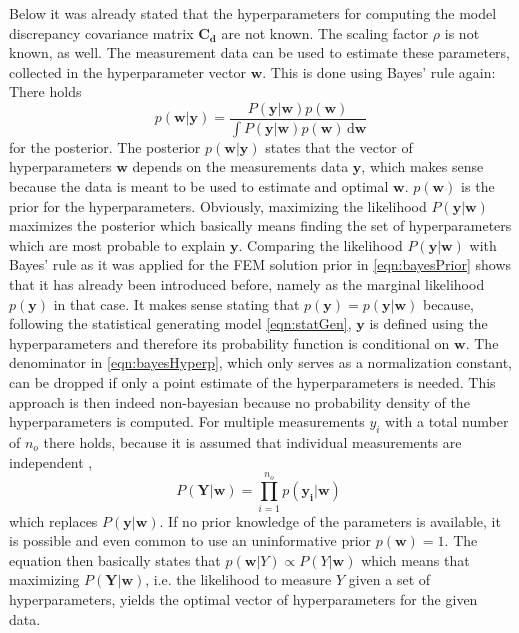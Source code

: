 \documentclass[%
  a4paper,oneside,%
  11pt,%
  smallchapters,
  style=printdev,
  extramargin,
  green,%
  rgb, <cmyk>
  ]{tubsbook}
\begin{document}
Below it was already stated that the hyperparameters for computing the model discrepancy covariance matrix $\bm{C_d}$ are not known. The scaling factor $\rho$ is not known, as well. The measurement data can be used to estimate these parameters, collected in the hyperparameter vector $\bm{w}$. This is done using Bayes' rule again: There holds
%
\begin{equation}
p(\bm{w}|\bm{y}) = \frac{P(\bm{y}|\bm{w}) p(\bm{w})}{\int P(\bm{y}|\bm{w}) p(\bm{w}) \, \mathrm{d}\bm{w}}
\label{eqn:bayesHyperp}
\end{equation}
%
for the posterior. The posterior $p(\bm{w}|\bm{y})$ states that the vector of hyperparameters $\bm{w}$ depends on the measurements data $\bm{y}$, which makes sense because the data is meant to be used to estimate and optimal $\bm{w}$. $p(\bm{w})$ is the prior for the hyperparameters. Obviously, maximizing the likelihood $P(\bm{y}|\bm{w})$ maximizes the posterior which basically means finding the set of hyperparameters which are most probable to explain $\bm{y}$. Comparing the likelihood $P(\bm{y}|\bm{w})$ with Bayes' rule as it was applied for the FEM solution prior in \ref{eqn:bayesPrior} shows that it has already been introduced before, namely as the marginal likelihood $p(\bm{y})$ in that case. It makes sense stating that $p(\bm{y}) = p(\bm{y}|\bm{w})$ because, following the statistical generating model \ref{eqn:statGen}, $\bm{y}$ is defined using the hyperparameters and therefore its probability function is conditional on $\bm{w}$. \cite[p.12]{girolami2021}
The denominator in \ref{eqn:bayesHyperp}, which only serves as a normalization constant, can be dropped if only a point estimate of the hyperparameters is needed. This approach is then indeed non-bayesian because no probability density of the hyperparameters is computed.
For multiple measurements $y_i$ with a total number of $n_o$ there holds, because it is assumed that individual measurements are independent \cite[p.9]{rasmussen2006},
\begin{equation}
P(\bm{Y}|\bm{w}) = \prod_{i=1}^{n_o} p(\bm{y_i}|\bm{w}) \; 
\end{equation}
which replaces $P(\bm{y}|\bm{w})$.
If no prior knowledge of the parameters is available, it is possible and even common to use an uninformative prior $p(\bm{w}) = 1$. \cite[p.433]{kennedy2001}
The equation then basically states that $p(\bm{w}|Y) \propto P(Y|\bm{w})$ which means that maximizing  $P(\bm{Y}|\bm{w})$, i.e. the likelihood to measure $Y$ given a set of hyperparameters, yields the optimal vector of hyperparameters for the given data. 
\end{document}
